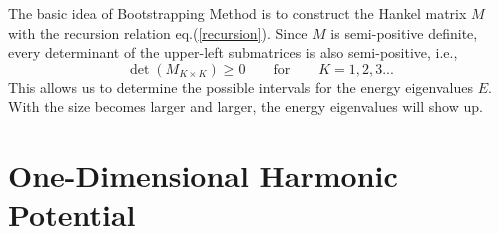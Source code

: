 \documentclass[10pt]{article}
\begin{document}
The basic idea of Bootstrapping Method is to construct the Hankel matrix $M$ with the recursion relation eq.(\ref{recursion}). Since $M$ is semi-positive definite, every determinant of the upper-left submatrices is also semi-positive, i.e.,
\begin{equation}
    \det(M_{K\times K}) \geq0 \qquad\text{for}\qquad K=1,2,3...
\end{equation}
This allows us to determine the possible intervals for the energy eigenvalues $E$. With the size becomes larger and larger, the energy eigenvalues will show up.


\section{One-Dimensional Harmonic Potential}\label{sec:2}
\end{document}
